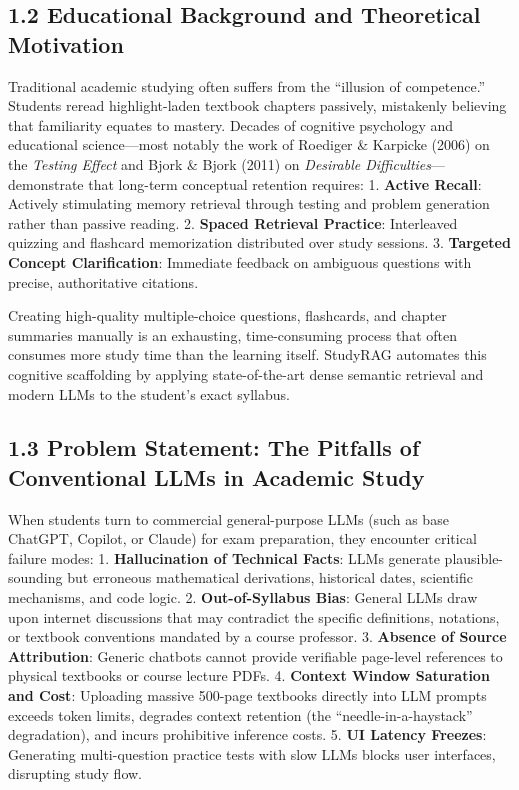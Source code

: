 \documentclass[
]{article}
\begin{document}
\subsection{1.2 Educational Background and Theoretical
Motivation}\label{educational-background-and-theoretical-motivation}

Traditional academic studying often suffers from the ``illusion of
competence.'' Students reread highlight-laden textbook chapters
passively, mistakenly believing that familiarity equates to mastery.
Decades of cognitive psychology and educational science---most notably
the work of Roediger \& Karpicke (2006) on the \emph{Testing Effect} and
Bjork \& Bjork (2011) on \emph{Desirable Difficulties}---demonstrate
that long-term conceptual retention requires: 1. \textbf{Active Recall}:
Actively stimulating memory retrieval through testing and problem
generation rather than passive reading. 2. \textbf{Spaced Retrieval
Practice}: Interleaved quizzing and flashcard memorization distributed
over study sessions. 3. \textbf{Targeted Concept Clarification}:
Immediate feedback on ambiguous questions with precise, authoritative
citations.

Creating high-quality multiple-choice questions, flashcards, and chapter
summaries manually is an exhausting, time-consuming process that often
consumes more study time than the learning itself. StudyRAG automates
this cognitive scaffolding by applying state-of-the-art dense semantic
retrieval and modern LLMs to the student's exact syllabus.

\subsection{1.3 Problem Statement: The Pitfalls of Conventional LLMs in
Academic
Study}\label{problem-statement-the-pitfalls-of-conventional-llms-in-academic-study}

When students turn to commercial general-purpose LLMs (such as base
ChatGPT, Copilot, or Claude) for exam preparation, they encounter
critical failure modes: 1. \textbf{Hallucination of Technical Facts}:
LLMs generate plausible-sounding but erroneous mathematical derivations,
historical dates, scientific mechanisms, and code logic. 2.
\textbf{Out-of-Syllabus Bias}: General LLMs draw upon internet
discussions that may contradict the specific definitions, notations, or
textbook conventions mandated by a course professor. 3. \textbf{Absence
of Source Attribution}: Generic chatbots cannot provide verifiable
page-level references to physical textbooks or course lecture PDFs. 4.
\textbf{Context Window Saturation and Cost}: Uploading massive 500-page
textbooks directly into LLM prompts exceeds token limits, degrades
context retention (the ``needle-in-a-haystack'' degradation), and incurs
prohibitive inference costs. 5. \textbf{UI Latency Freezes}: Generating
multi-question practice tests with slow LLMs blocks user interfaces,
disrupting study flow.
\end{document}
